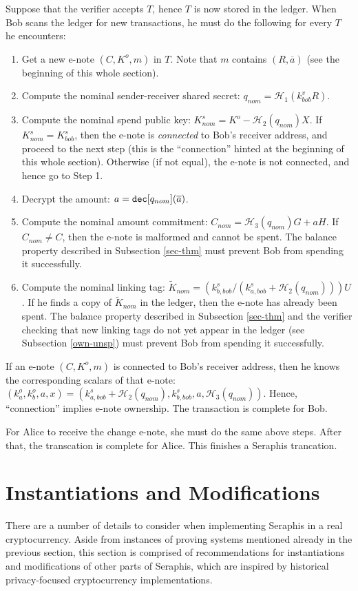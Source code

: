\documentclass{article}
\theoremstyle{plain}
\theoremstyle{remark}
\begin{document}
Suppose that the verifier accepts $T$, hence $T$ is now stored in the ledger. When Bob scans the ledger for new transactions, he must do the following for every $T$ he encounters:
\begin{enumerate}
    \item Get a new e-note $(C, K^o, m)$ in $T$. Note that $m$ contains $(R, \overline{a})$ (see the beginning of this whole section).
    \item Compute the nominal sender-receiver shared secret: $q_{nom} = \mathcal{H}_1(k_{bob}^v R)$.
    \item Compute the nominal spend public key: $K_{nom}^s = K^o - \mathcal{H}_2(q_{nom})X$. If $K_{nom}^s = K_{bob}^s$, then the e-note is \textit{connected} to Bob's receiver address, and proceed to the next step (this is the ``connection'' hinted at the beginning of this whole section).  Otherwise (if not equal), the e-note is not connected, and hence go to Step 1.
    \item Decrypt the amount: $a = {\tt dec}[q_{nom}](\overline a)$.
    \item Compute the nominal amount commitment: $C_{nom} = \mathcal{H}_3(q_{nom})G + a H$. If $C_{nom} \ne C$, then the e-note is malformed and cannot be spent. The balance property described in Subsection \ref{sec-thm} must prevent Bob from spending it successfully.
    \item Compute the nominal linking tag: $\tilde{K}_{nom} = (k_{b, bob}^s/(k_{a, bob}^s + \mathcal{H}_2(q_{nom})))U$. If he finds a copy of $\tilde{K}_{nom}$ in the ledger, then the e-note has already been spent. The balance property described in Subsection \ref{sec-thm} and the verifier checking that new linking tags do not yet appear in the ledger (see Subsection \ref{own-unsp}) must prevent Bob from spending it successfully.
\end{enumerate}
If an e-note $(C, K^o, m)$ is connected to Bob's receiver address, then he knows the corresponding scalars of that e-note: $(k_a^o, k_b^o, a, x) = (k_{a, bob}^s + \mathcal{H}_2(q_{nom}), k_{b, bob}^s, a, \mathcal{H}_3(q_{nom}))$. Hence, ``connection'' implies e-note ownership. The transaction is complete for Bob.

For Alice to receive the change e-note, she must do the same above steps. After that, the transcation is complete for Alice. This finishes a Seraphis trancation.

\section{Instantiations and Modifications}\label{inst}
There are a number of details to consider when implementing Seraphis in a real cryptocurrency. Aside from instances of proving systems mentioned already in the previous section, this section is comprised of recommendations for instantiations and modifications of other parts of Seraphis, which are inspired by historical privacy-focused cryptocurrency implementations.
\end{document}
